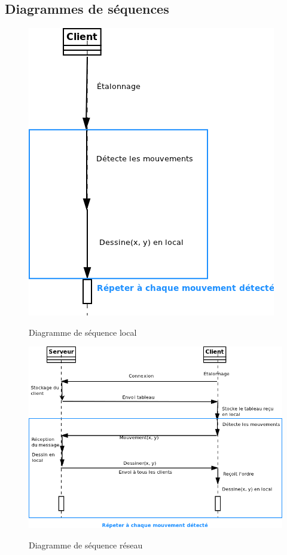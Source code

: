 \documentclass{report}
\begin{document}
			\subsection{Diagrammes de séquences}
				\begin{figure}[!h]
						\centering
						\includegraphics[scale=0.6]{../soutenance/sequence_local.png}\\
						\caption{Diagramme de séquence local}
						\label{Diagramme de séquence local}
				\end{figure}

				\newpage
				\begin{figure}[!h]
						\centering
						\includegraphics[scale=0.6]{../soutenance/sequence_reseau.png}\\
						\caption{Diagramme de séquence réseau}
						\label{Diagramme de séquence réseau}
				\end{figure}
\end{document}
